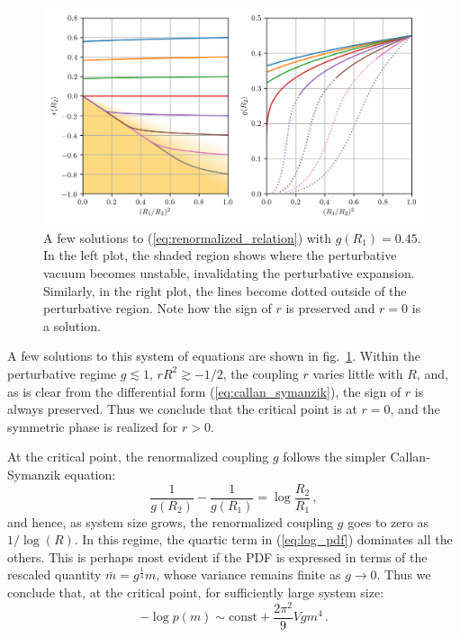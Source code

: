 \documentclass[11pt,a4paper]{article}
\begin{document}
\begin{figure}
\begin{center}
\includegraphics[scale=0.75]{renormalization_group.png}
\end{center}
    \caption{\label{fig:renormalization_group} A few solutions to
    (\ref{eq:renormalized_relation}) with $g(R_1) = 0.45$.  In the left plot,
    the shaded region shows where the perturbative vacuum becomes unstable,
    invalidating the perturbative expansion. Similarly, in the right plot, the
    lines become dotted outside of the perturbative region. Note how the sign
    of $r$ is preserved and $r = 0$ is a solution.}
\end{figure}

A few solutions to this system of equations are shown in
fig.~\ref{fig:renormalization_group}. Within the perturbative regime $g
\lesssim 1$, $r R^2 \gtrsim -1/2$, the coupling $r$ varies little with
$R$, and, as is clear from the differential form (\ref{eq:callan_symanzik}),
the sign of $r$ is always preserved. Thus we conclude that the critical point
is at $r = 0$, and the symmetric phase is realized for $r > 0$.

At the critical point, the renormalized coupling $g$ follows the simpler
Callan-Symanzik equation:
\begin{equation}
    \frac{1}{g(R_2)} - \frac{1}{g(R_1)} = \log\frac{R_2}{R_1}\,,
\end{equation}
and hence, as system size grows, the renormalized coupling $g$ goes to zero as
$1 / \log(R)$.  In this regime, the quartic term in (\ref{eq:log_pdf})
dominates all the others. This is perhaps most evident if the PDF is expressed
in terms of the rescaled quantity $\bar{m} = g^{\frac{1}{4}} m$, whose variance
remains finite as $g\to0$. Thus we conclude that, at the critical point, for
sufficiently large system size:
\begin{equation}
    \label{eq:log_pdf_critical_point}
    -\log p(m) \sim \mathrm{const} + \frac{2\pi^2}{9} V gm^4\,.
\end{equation}
\end{document}
